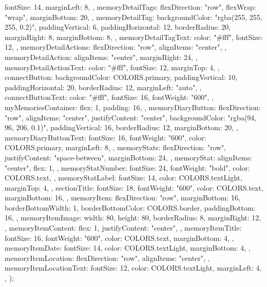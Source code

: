 {{    fontSize: 14,
    marginLeft: 8,
  },
  memoryDetailTags: {
    flexDirection: "row",
    flexWrap: "wrap",
    marginBottom: 20,
  },
  memoryDetailTag: {
    backgroundColor: "rgba(255, 255, 255, 0.2)",
    paddingVertical: 6,
    paddingHorizontal: 12,
    borderRadius: 20,
    marginRight: 8,
    marginBottom: 8,
  },
  memoryDetailTagText: {
    color: "#fff",
    fontSize: 12,
  },
  memoryDetailActions: {
    flexDirection: "row",
    alignItems: "center",
  },
  memoryDetailAction: {
    alignItems: "center",
    marginRight: 24,
  },
  memoryDetailActionText: {
    color: "#fff",
    fontSize: 12,
    marginTop: 4,
  },
  connectButton: {
    backgroundColor: COLORS.primary,
    paddingVertical: 10,
    paddingHorizontal: 20,
    borderRadius: 12,
    marginLeft: "auto",
  },
  connectButtonText: {
    color: "#fff",
    fontSize: 16,
    fontWeight: "600",
  },
  myMemoriesContainer: {
    flex: 1,
    padding: 16,
  },
  memoryDiaryButton: {
    flexDirection: "row",
    alignItems: "center",
    justifyContent: "center",
    backgroundColor: "rgba(94, 96, 206, 0.1)",
    paddingVertical: 16,
    borderRadius: 12,
    marginBottom: 20,
  },
  memoryDiaryButtonText: {
    fontSize: 16,
    fontWeight: "600",
    color: COLORS.primary,
    marginLeft: 8,
  },
  memoryStats: {
    flexDirection: "row",
    justifyContent: "space-between",
    marginBottom: 24,
  },
  memoryStat: {
    alignItems: "center",
    flex: 1,
  },
  memoryStatNumber: {
    fontSize: 24,
    fontWeight: "bold",
    color: COLORS.text,
  },
  memoryStatLabel: {
    fontSize: 14,
    color: COLORS.textLight,
    marginTop: 4,
  },
  sectionTitle: {
    fontSize: 18,
    fontWeight: "600",
    color: COLORS.text,
    marginBottom: 16,
  },
  memoryItem: {
    flexDirection: "row",
    marginBottom: 16,
    borderBottomWidth: 1,
    borderBottomColor: COLORS.border,
    paddingBottom: 16,
  },
  memoryItemImage: {
    width: 80,
    height: 80,
    borderRadius: 8,
    marginRight: 12,
  },
  memoryItemContent: {
    flex: 1,
    justifyContent: "center",
  },
  memoryItemTitle: {
    fontSize: 16,
    fontWeight: "600",
    color: COLORS.text,
    marginBottom: 4,
  },
  memoryItemDate: {
    fontSize: 14,
    color: COLORS.textLight,
    marginBottom: 4,
  },
  memoryItemLocation: {
    flexDirection: "row",
    alignItems: "center",
  },
  memoryItemLocationText: {
    fontSize: 12,
    color: COLORS.textLight,
    marginLeft: 4,
  },
});
